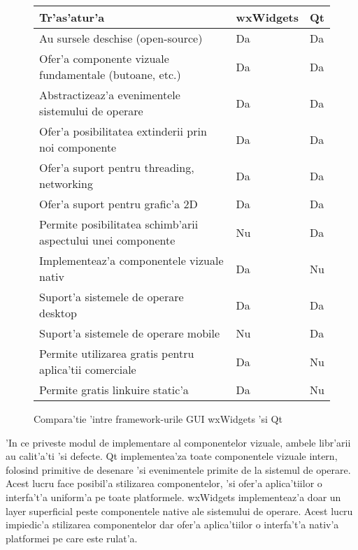 \begin{center}
\begin{figure}[H]
    \centering
    \begin{tabular}{ |p{11cm}|p{2.5cm}|p{0.8cm}| }
        \hline
        \textbf{Tr'as'atur'a} & \textbf{wxWidgets} & \textbf{Qt} \\
        \hline
        Au sursele deschise (open-source)                                           & Da & Da \\
        Ofer'a componente vizuale fundamentale (butoane, etc.)                      & Da & Da \\
        Abstractizeaz'a evenimentele sistemului de operare                          & Da & Da \\
        Ofer'a posibilitatea extinderii prin noi componente                         & Da & Da \\
        Ofer'a suport pentru threading, networking                                  & Da & Da \\
        Ofer'a suport pentru grafic'a 2D                                            & Da & Da \\
        Permite posibilitatea schimb'arii aspectului unei componente                & Nu & Da \\
        Implementeaz'a componentele vizuale nativ                                   & Da & Nu \\
        Suport'a sistemele de operare desktop                                       & Da & Da \\
        Suport'a sistemele de operare mobile                                        & Nu & Da \\
        Permite utilizarea gratis pentru aplica'tii comerciale                      & Da & Nu \\
        Permite gratis linkuire static'a                                            & Da & Nu \\
        \hline
    \end{tabular}
    \caption{Compara'tie 'intre framework-urile GUI wxWidgets 'si Qt}
    \label{comp}
\end{figure}
\end{center}

'In ce priveste modul de implementare al componentelor vizuale, ambele libr'arii au calit'a'ti 'si defecte. Qt implementea'za toate componentele vizuale intern, folosind primitive de desenare 'si evenimentele primite de la sistemul de operare. Acest lucru face posibil'a stilizarea componentelor, 'si ofer'a aplica'tiilor o interfa't'a uniform'a pe toate platformele. wxWidgets implementeaz'a doar un layer superficial peste componentele native ale sistemului de operare. Acest lucru impiedic'a stilizarea componentelor dar ofer'a aplica'tiilor o interfa't'a nativ'a platformei pe care este rulat'a.

